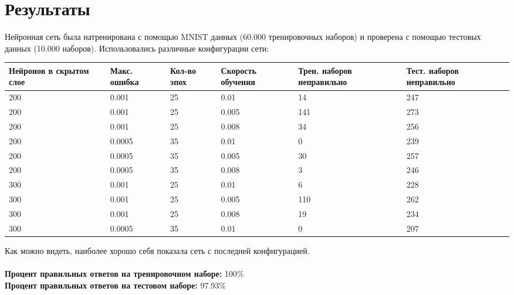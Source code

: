 \documentclass{article}
\begin{document}
\section{Результаты}
Нейронная сеть была натренирована с помощью MNIST данных (60.000 тренировочных наборов) и проверена с помощью тестовых данных (10.000 наборов). Использовались различные конфигурации сети:
\begin{center}
	\begin{tabular}{| p{1.7cm} | p{1.5cm} | p{1.3cm} | p{1.5cm} | p{2.5cm} | p{2.5cm} |}
		\hline
		Нейронов в скрытом слое & Макс. ошибка & Кол-во эпох & Скорость обучения & \cellcolor{blue!25} Трен. наборов неправильно & \cellcolor{blue!25} Тест. наборов неправильно \\ \hline
		200 & 0.001 & 25 & 0.01 & 14 & 247 \\ \hline
		200 & 0.001 & 25 & 0.005 & 141 & 273 \\ \hline
		200 & 0.001 & 25 & 0.008 & 34 & 256 \\ \hline
		200 & 0.0005 & 35 & 0.01 & 0 & 239 \\ \hline
		200 & 0.0005 & 35 & 0.005 & 30 & 257 \\ \hline
		200 & 0.0005 & 35 & 0.008 & 3 & 246 \\ \hline
		300 & 0.001 & 25 & 0.01 & 6 & 228 \\ \hline
		300 & 0.001 & 25 & 0.005 & 110 & 262 \\ \hline
		300 & 0.001 & 25 & 0.008 & 19 & 234 \\ \hline
		\rowcolor{blue!25}
		300 & 0.0005 & 35 & 0.01 & 0 & 207 \\
		\hline
	\end{tabular}
\end{center}
Как можно видеть, наиболее хорошо себя показала сеть с последней конфигурацией. \\ 
\vspace{3mm} \\
\textbf{Процент правильных ответов на тренировочном наборе:} 100\% \\
\textbf{Процент правильных ответов на тестовом наборе:} 97.93\%
\end{document}

